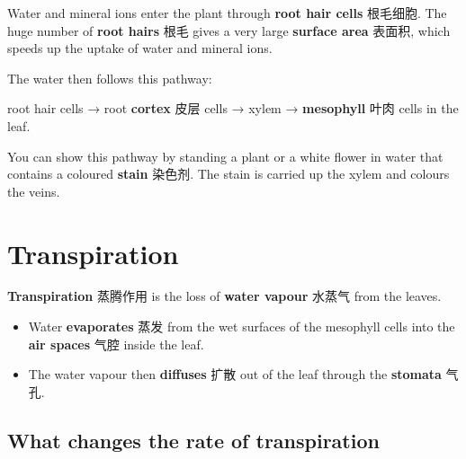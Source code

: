\documentclass[11pt]{article}
\begin{document}
Water and mineral ions enter the plant through \textbf{root hair cells} 根毛细胞. The huge number of \textbf{root hairs} 根毛 gives a very large \textbf{surface area} 表面积, which speeds up the uptake of water and mineral ions.

The water then follows this pathway:

root hair cells → root \textbf{cortex} 皮层 cells → xylem → \textbf{mesophyll} 叶肉 cells in the leaf.

You can show this pathway by standing a plant or a white flower in water that contains a coloured \textbf{stain} 染色剂. The stain is carried up the xylem and colours the veins.

\section*{Transpiration}

\textbf{Transpiration} 蒸腾作用 is the loss of \textbf{water vapour} 水蒸气 from the leaves.

\begin{itemize}
\item Water \textbf{evaporates} 蒸发 from the wet surfaces of the mesophyll cells into the \textbf{air spaces} 气腔 inside the leaf.

\item The water vapour then \textbf{diffuses} 扩散 out of the leaf through the \textbf{stomata} 气孔.

\end{itemize}

\subsection*{What changes the rate of transpiration}

\begin{center}
\end{center}
\end{document}
